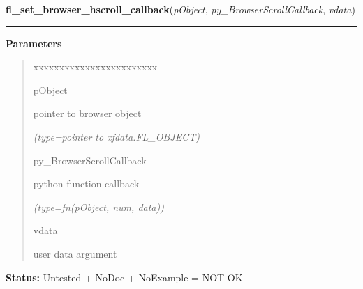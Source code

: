 \hspace{.8\funcindent}\begin{boxedminipage}{\funcwidth}

    \raggedright \textbf{fl\_set\_browser\_hscroll\_callback}(\textit{pObject}, \textit{py\_BrowserScrollCallback}, \textit{vdata})

    \vspace{-1.5ex}

    \rule{\textwidth}{0.5\fboxrule}
\setlength{\parskip}{2ex}
\setlength{\parskip}{1ex}
      \textbf{Parameters}
      \vspace{-1ex}

      \begin{quote}
        \begin{Ventry}{xxxxxxxxxxxxxxxxxxxxxxxx}

          \item[pObject]

          pointer to browser object

            {\it (type=pointer to xfdata.FL\_OBJECT)}

          \item[py\_BrowserScrollCallback]

          python function callback

            {\it (type=fn(pObject, num, data))}

          \item[vdata]

          user data argument

        \end{Ventry}

      \end{quote}

\textbf{Status:} Untested + NoDoc + NoExample = NOT OK



    \end{boxedminipage}

    \label{xformslib:library:fl_set_browser_vscroll_callback}

    \vspace{0.5ex}

